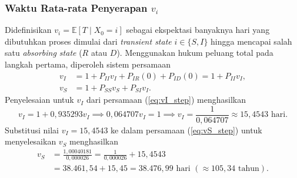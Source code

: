 \documentclass[12pt,a4paper]{article}
\numberwithin{equation}{section}
\begin{document}
\subsubsection{Waktu Rata-rata Penyerapan \texorpdfstring{$v_i$}{v\_i}}
Didefinisikan $v_i = \mathbb{E}[T \mid X_0 = i]$ sebagai ekspektasi banyaknya hari yang dibutuhkan proses dimulai dari \textit{transient state} $i \in \{S, I\}$ hingga mencapai salah satu \textit{absorbing state} ($R$ atau $D$). Menggunakan hukum peluang total pada langkah pertama, diperoleh sistem persamaan
\begin{align}
  v_I &= 1 + P_{II} v_I + P_{IR}(0) + P_{ID}(0) = 1 + P_{II} v_I, \label{eq:vI_step} \\
  v_S &= 1 + P_{SS} v_S + P_{SI} v_I. \label{eq:vS_step}
\end{align}
Penyelesaian untuk $v_I$ dari persamaan (\ref{eq:vI_step}) menghasilkan
\begin{equation*}
  v_I = 1 + 0{,}935293 v_I \implies 0{,}064707 v_I = 1 \implies v_I = \frac{1}{0{,}064707} \approx 15{,}4543 \text{ hari}.
\end{equation*}
Substitusi nilai $v_I = 15{,}4543$ ke dalam persamaan (\ref{eq:vS_step}) untuk menyelesaikan $v_S$ menghasilkan
\begin{align*}
  v_S &= \frac{1{,}00040181}{0{,}000026} = \frac{1}{0{,}000026} + 15{,}4543 \\
      &= 38.461{,}54 + 15{,}45 = 38.476{,}99 \text{ hari } (\approx 105{,}34 \text{ tahun}).
\end{align*}
\end{document}
